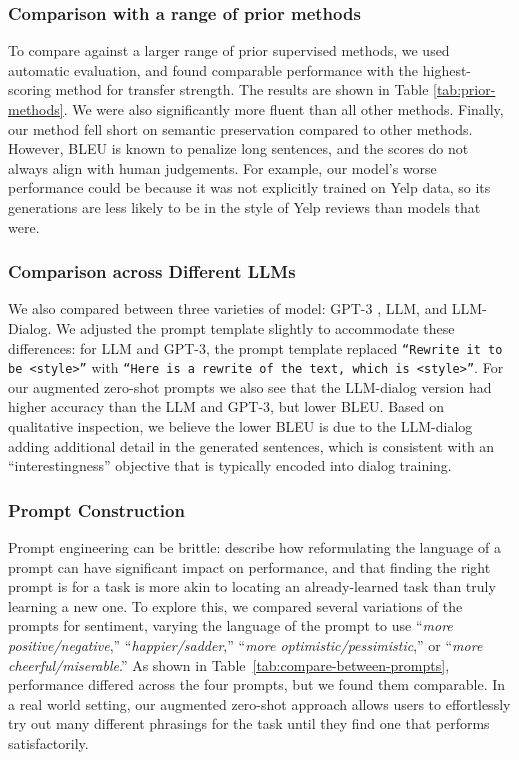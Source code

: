 \subsubsection{Comparison with a range of prior methods}
To compare against a larger range of prior supervised methods, we used automatic evaluation, and found comparable performance with the highest-scoring method for transfer strength.
The results are shown in Table \ref{tab:prior-methods}.
We were also significantly more fluent than all other methods.
Finally, our method fell short on semantic preservation compared to other methods. However, BLEU is known to penalize long sentences, and the scores do not always align with human judgements.
For example, our model's worse performance could be because it was not explicitly trained on Yelp data, so its generations are less likely to be in the style of Yelp reviews than models that were.



\subsubsection{Comparison across Different LLMs}
We also compared between three varieties of model: GPT-3 \citep{DBLP:journals/corr/abs-2005-14165}, LLM, and  LLM-Dialog. We adjusted the prompt template slightly to accommodate these differences: for  LLM and GPT-3, the prompt template replaced {\small
\texttt{``Rewrite it to be \textbf{<style>}''}
with \small \texttt{``Here is a rewrite of the text, which is \textbf{<style>}''}.}
For our augmented zero-shot prompts we also see that the LLM-dialog version had higher accuracy than the LLM and GPT-3, but lower BLEU. Based on qualitative inspection, we believe the lower BLEU is due to the LLM-dialog adding additional detail in the generated sentences, which is consistent with an ``interestingness'' objective that is typically encoded into dialog training. 


\subsubsection{Prompt Construction}
\label{sec:prompt-selection}
Prompt engineering can be brittle: \citet{reynolds2021prompt} describe how reformulating the language of a prompt can have significant impact on performance, and that finding the right prompt is for a task is more akin to locating an already-learned task than truly learning a new one.
To explore this, we compared several variations of the prompts for sentiment, varying the language of the prompt to use ``\textit{more {positive/negative}},'' ``\textit{{happier/sadder}},''
``\textit{more {optimistic/pessimistic}},'' or
``\textit{more {cheerful/miserable}}.''
As shown in Table~\ref{tab:compare-between-prompts}, performance differed across the four prompts, but we found them comparable.
In a real world setting, our augmented zero-shot approach allows users to effortlessly try out many different phrasings for the task until they find one that performs satisfactorily.


